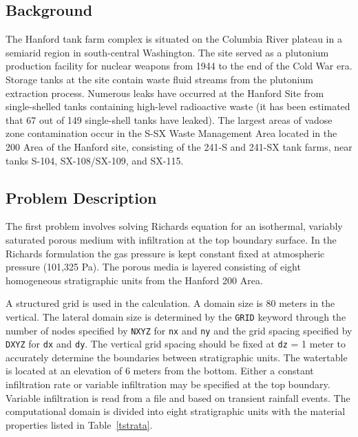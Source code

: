 \documentclass[12pt]{article}
\begin{document}
\subsection{Background}

The Hanford tank farm complex is situated on the Columbia River plateau in a semiarid region in south-central Washington. The site served as a plutonium production facility for nuclear weapons from 1944 to the end of the Cold War era. Storage tanks at the site contain waste fluid streams from the plutonium extraction process. Numerous leaks have occurred at the Hanford Site from single-shelled tanks containing high-level radioactive waste (it has been estimated that 67 out of 149 single-shell tanks have leaked). The largest areas of vadose zone contamination occur in the S-SX Waste Management Area located in the 200 Area of the Hanford site, consisting of the 241-S and 241-SX tank farms, near tanks S-104, SX-108/SX-109, and SX-115. 

\subsection{Problem Description}

The first problem involves solving Richards equation for an isothermal, variably saturated porous medium with infiltration at the top boundary surface. In the Richards formulation the gas pressure is kept constant fixed at atmospheric pressure (101,325 Pa). The porous media is layered consisting of eight homogeneous stratigraphic units from the Hanford 200 Area.

A structured grid is used in the calculation.
A domain size is 80 meters in the vertical. The lateral domain size is determined by the {\tt GRID} keyword through the number of nodes specified by {\tt NXYZ} for {\tt nx} and {\tt ny} and the grid spacing specified by {\tt DXYZ} for {\tt dx} and {\tt dy}. The vertical grid spacing should be fixed at {\tt dz} = 1 meter to accurately determine the boundaries between stratigraphic units. The watertable is located at an elevation of 6 meters from the bottom. 
Either a constant infiltration rate or variable infiltration may be specified at the top boundary. Variable infiltration is read from a file and based on transient rainfall events.
The computational domain is divided into eight stratigraphic units with the material properties listed in Table~\ref{tstrata}.
\end{document}
